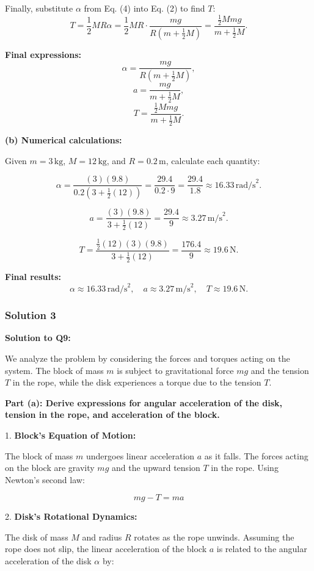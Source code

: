 \documentclass{article}
\begin{document}
Finally, substitute $\alpha$ from Eq. (4) into Eq. (2) to find $T$:
\[
T = \frac{1}{2} M R \alpha = \frac{1}{2} M R \cdot \frac{mg}{R \left(m + \frac{1}{2} M\right)} = \frac{\frac{1}{2} M m g}{m + \frac{1}{2} M} \tag{6}.
\]

\textbf{Final expressions:}
\[
\alpha = \frac{mg}{R \left(m + \frac{1}{2} M\right)},
\]
\[
a = \frac{mg}{m + \frac{1}{2} M},
\]
\[
T = \frac{\frac{1}{2} M m g}{m + \frac{1}{2} M}.
\]

\textbf{(b) Numerical calculations:}

Given $m = 3 \, \text{kg}$, $M = 12 \, \text{kg}$, and $R = 0.2 \, \text{m}$, calculate each quantity:

\[
\alpha = \frac{(3)(9.8)}{0.2 \left(3 + \frac{1}{2} (12)\right)} = \frac{29.4}{0.2 \cdot 9} = \frac{29.4}{1.8} \approx 16.33 \, \text{rad/s}^2.
\]

\[
a = \frac{(3)(9.8)}{3 + \frac{1}{2} (12)} = \frac{29.4}{9} \approx 3.27 \, \text{m/s}^2.
\]

\[
T = \frac{\frac{1}{2} (12)(3)(9.8)}{3 + \frac{1}{2} (12)} = \frac{176.4}{9} \approx 19.6 \, \text{N}.
\]

\textbf{Final results:}
\[
\alpha \approx 16.33 \, \text{rad/s}^2, \quad a \approx 3.27 \, \text{m/s}^2, \quad T \approx 19.6 \, \text{N}.
\]

\subsubsection{Solution 3}
\textbf{Solution to Q9:}

We analyze the problem by considering the forces and torques acting on the system. The block of mass $m$ is subject to gravitational force $mg$ and the tension $T$ in the rope, while the disk experiences a torque due to the tension $T$.

\textbf{Part (a): Derive expressions for angular acceleration of the disk, tension in the rope, and acceleration of the block.}

1. \textbf{Block's Equation of Motion:}

The block of mass $m$ undergoes linear acceleration $a$ as it falls. The forces acting on the block are gravity $mg$ and the upward tension $T$ in the rope. Using Newton's second law:

\[
mg - T = ma \tag{1}
\]

2. \textbf{Disk's Rotational Dynamics:}

The disk of mass $M$ and radius $R$ rotates as the rope unwinds. Assuming the rope does not slip, the linear acceleration of the block $a$ is related to the angular acceleration of the disk $\alpha$ by:
\end{document}
